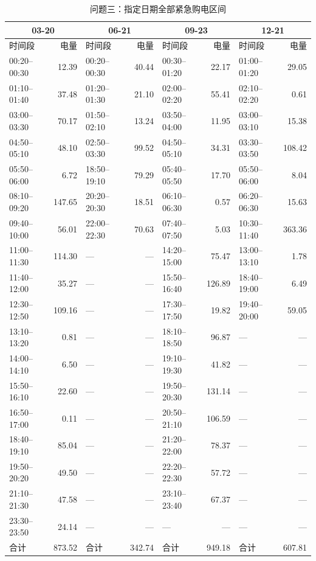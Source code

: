 \FloatBarrier
\begin{table}[htbp]\centering\scriptsize
\caption{问题三：指定日期全部紧急购电区间}
\setlength{\tabcolsep}{3pt}\begin{tabular}{lrlrlrlr}\toprule
\multicolumn{2}{c}{03-20} & \multicolumn{2}{c}{06-21} & \multicolumn{2}{c}{09-23} & \multicolumn{2}{c}{12-21}\\\midrule
时间段 & 电量 & 时间段 & 电量 & 时间段 & 电量 & 时间段 & 电量\\
00:20--00:30 & 12.39 & 00:20--00:30 & 40.44 & 00:30--01:20 & 22.17 & 01:00--01:20 & 29.05\\
01:10--01:40 & 37.48 & 01:20--01:30 & 21.10 & 02:00--02:20 & 55.41 & 02:10--02:20 & 0.61\\
03:00--03:30 & 70.17 & 01:50--02:10 & 13.24 & 03:50--04:00 & 11.95 & 03:00--03:10 & 15.38\\
04:50--05:10 & 48.10 & 02:50--03:30 & 99.52 & 04:50--05:10 & 34.31 & 03:30--03:50 & 108.42\\
05:50--06:00 & 6.72 & 18:50--19:10 & 79.29 & 05:40--05:50 & 17.70 & 05:50--06:00 & 8.04\\
08:10--09:20 & 147.65 & 20:20--20:30 & 18.51 & 06:10--06:30 & 0.57 & 06:20--06:30 & 15.63\\
09:40--10:00 & 56.01 & 22:00--22:30 & 70.63 & 07:40--07:50 & 5.03 & 10:30--11:40 & 363.36\\
11:00--11:30 & 114.30 & — & — & 14:20--15:00 & 75.47 & 13:00--13:10 & 1.78\\
11:40--12:00 & 35.27 & — & — & 15:50--16:40 & 126.89 & 18:40--19:00 & 6.49\\
12:30--12:50 & 109.16 & — & — & 17:30--17:50 & 19.82 & 19:40--20:00 & 59.05\\
13:10--13:20 & 0.81 & — & — & 18:10--18:50 & 96.87 & — & —\\
14:00--14:10 & 6.50 & — & — & 19:10--19:30 & 41.82 & — & —\\
15:50--16:10 & 22.60 & — & — & 19:50--20:30 & 131.14 & — & —\\
16:50--17:00 & 0.11 & — & — & 20:50--21:10 & 106.59 & — & —\\
18:40--19:10 & 85.04 & — & — & 21:20--22:00 & 78.37 & — & —\\
19:50--20:20 & 49.50 & — & — & 22:20--22:30 & 57.72 & — & —\\
21:10--21:30 & 47.58 & — & — & 23:10--23:40 & 67.37 & — & —\\
23:30--23:50 & 24.14 & — & — & — & — & — & —\\
合计 & 873.52 & 合计 & 342.74 & 合计 & 949.18 & 合计 & 607.81\\
\bottomrule\end{tabular}\end{table}

